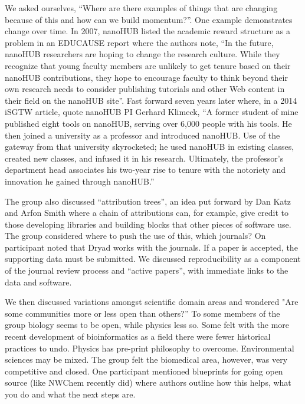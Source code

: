 \documentclass[11pt, oneside]{amsart}
\begin{document}
We asked ourselves, ``Where are there examples of things that are changing
because of this and how can we build momentum?''. One example demonstrates
change over time. In 2007, nanoHUB listed the academic reward structure as
a problem in an EDUCAUSE report where the authors note, ``In the future,
nanoHUB researchers are hoping to change the research culture. While they
recognize that young faculty members are unlikely to get tenure based on
their nanoHUB contributions, they hope to encourage faculty to think
beyond their own research needs to consider publishing tutorials and other
Web content in their field on the nanoHUB site''. Fast forward seven years
later where, in a 2014 iSGTW article, quote nanoHUB PI Gerhard Klimeck, ``A
former student of mine published eight tools on nanoHUB, serving over
6,000 people with his tools. He then joined a university as a professor
and introduced nanoHUB. Use of the gateway from that university
skyrocketed; he used nanoHUB in existing classes, created new classes, and
infused it in his research. Ultimately, the professor's department head
associates his two-year rise to tenure with the notoriety and innovation
he gained through nanoHUB.''

The group also discussed ``attribution trees'', an idea put forward by Dan
Katz and Arfon Smith where a chain of attributions can, for example, give
credit to those developing libraries and building blocks that other pieces
of software use. The group considered where to push the use of this, which
journals? On participant noted that Dryad works with the journals. If a
paper is accepted, the supporting data must be submitted. We discussed
reproducibility as a component of the journal review process and ``active
papers'', with immediate links to the data and software.

We then discussed variations amongst scientific domain areas and wondered
"Are some communities more or less open than others?'' To some members of
the group biology seems to be open, while physics less so. Some felt with
the more recent development of bioinformatics as a field there were fewer
historical practices to undo. Physics has pre-print philosophy to
overcome. Environmental sciences may be mixed. The group felt the
biomedical area, however, was very competitive and closed. One participant
mentioned blueprints for going open source (like NWChem recently did)
where authors outline how this helps, what you do and what the next steps
are.
\end{document}
